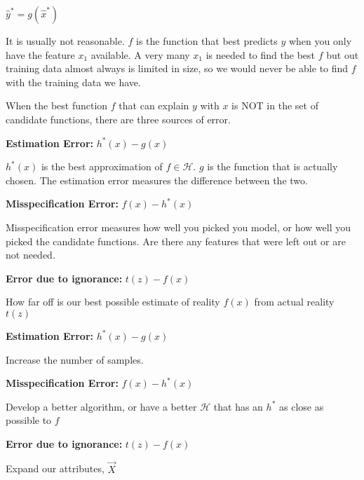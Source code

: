 \documentclass[12pt]{article}
\begin{document}
\begin{enumerate}
$\hat{y}^* = g(\hat{x}^*)$


It is usually not reasonable. $f$ is the function that best predicts $y$ when you only have the feature $x_1$ available. A very many $x_1$ is needed to find the best $f$ but out training data almost always is limited in size, so we would never be able to find $f$ with the training data we have.


When the best function $f$ that can explain $y$ with $x$ is NOT in the set of candidate functions, there are three sources of error.


\textbf{Estimation Error:} $h^*(x) - g(x)$

$h^*(x)$ is the best approximation of $f \in \mathcal{H}$. $g$ is the function that is actually chosen. The estimation error measures the difference between the two. 

\textbf{Misspecification Error:} $f(x) - h^*(x)$

Misspecification error measures how well you picked you model, or how well you picked the candidate functions. Are there any features that were left out or are not needed.

\textbf{Error due to ignorance:} $t(z) - f(x)$

How far off is our best possible estimate of reality $f(x)$ from actual reality $t(z)$


\textbf{Estimation Error:} $h^*(x) - g(x)$

Increase the number of samples.

\textbf{Misspecification Error:} $f(x) - h^*(x)$

Develop a better algorithm, or have a better $\mathcal{H}$ that has an $h^*$ as close as possible to $f$

\textbf{Error due to ignorance:} $t(z) - f(x)$

Expand our attributes, $\vec{X}$


\end{enumerate}
\end{document}
